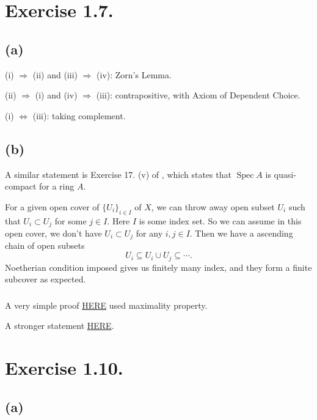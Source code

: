 \section{Exercise 1.7.}

\subsection{(a)}

(i) $\Rightarrow$ (ii) and (iii) $\Rightarrow$ (iv): Zorn's Lemma.

(ii) $\Rightarrow$ (i) and (iv) $\Rightarrow$ (iii): contrapositive, with Axiom of Dependent Choice.

(i) $\Leftrightarrow$ (iii): taking complement.

\subsection{(b)}

A similar statement is Exercise 17. (v) of \cite{atiyah1994introduction}, which states that $\operatorname{Spec}A$ is quasi-compact for a ring $A$.

For a given open cover of $\{U_i\}_{i\in I}$ of $X$, we can throw away open subset $U_i$ such that $U_i\subset U_j$ for some $j\in I$. Here $I$ is some index set.
So we can assume in this open cover, we don't have $U_i\subset U_j$ for any $i,j\in I$.
Then we have a ascending chain of open subsets 
\[U_i\subseteq U_i\cup U_j \subseteq\cdots.\]
Noetherian condition imposed gives us finitely many index, and they form a finite subcover as expected.

\subsubsection{}

A very simple proof \href{https://math.stackexchange.com/questions/1442665/a-noetherian-topological-space-is-compact}{HERE} used maximality property.

A stronger statement \href{https://math.stackexchange.com/questions/2745543/v-is-noetherian-space-if-only-if-every-open-subset-of-v-is-compact}{HERE}.

\section{Exercise 1.10.}

\subsection{(a)}

